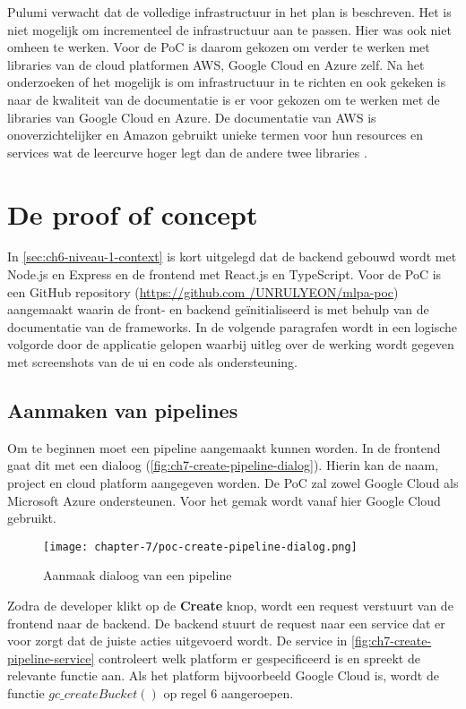 Pulumi verwacht dat de volledige infrastructuur in het plan is beschreven. Het is niet mogelijk om incrementeel de infrastructuur aan te passen. Hier was ook niet omheen te werken. Voor de PoC is daarom gekozen om verder te werken met libraries van de cloud platformen AWS, Google Cloud en Azure zelf. Na het onderzoeken of het mogelijk is om infrastructuur in te richten en ook gekeken is naar de kwaliteit van de documentatie is er voor gekozen om te werken met de libraries van Google Cloud en Azure. De documentatie van AWS is onoverzichtelijker en Amazon gebruikt unieke termen voor hun resources en services wat de leercurve hoger legt dan de andere twee libraries \cite{aws-sdk-javascript-docs}.

\section{De proof of concept}\label{sec:ch7-de-proof-of-concept}
In \autoref{sec:ch6-niveau-1-context} is kort uitgelegd dat de backend gebouwd wordt met Node.js en Express en de frontend met React.js en TypeScript. Voor de PoC is een GitHub repository (\hyperlink{https://github.com/UNRULYEON/mlpa-poc}{https://github.com /UNRULYEON/mlpa-poc}) aangemaakt waarin de front- en backend geïnitialiseerd is met behulp van de documentatie van de frameworks. In de volgende paragrafen wordt in een logische volgorde door de applicatie gelopen waarbij uitleg over de werking wordt gegeven met screenshots van de \acrshort{ui} en code als ondersteuning.

\subsection{Aanmaken van pipelines}\label{subsec:ch7-aanmaken-van-pipelines}
Om te beginnen moet een pipeline aangemaakt kunnen worden. In de frontend gaat dit met een dialoog (\autoref{fig:ch7-create-pipeline-dialog}). Hierin kan de naam, project en cloud platform aangegeven worden. De PoC zal zowel Google Cloud als Microsoft Azure ondersteunen. Voor het gemak wordt vanaf hier Google Cloud gebruikt. 

\begin{figure}[hbt!]
  \centering
  \texttt{[image: chapter-7/poc-create-pipeline-dialog.png]}
  \caption{Aanmaak dialoog van een pipeline}
  \label{fig:ch7-create-pipeline-dialog}
\end{figure}

Zodra de developer klikt op de \textbf{Create} knop, wordt een request verstuurt van de frontend naar de backend. De backend stuurt de request naar een service dat er voor zorgt dat de juiste acties uitgevoerd wordt. De service in \autoref{fig:ch7-create-pipeline-service} controleert welk platform er gespecificeerd is en spreekt de relevante functie aan. Als het platform bijvoorbeeld Google Cloud is, wordt de functie \(gc\_createBucket()\) op regel 6 aangeroepen.

